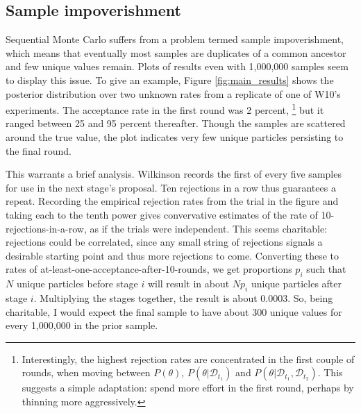 \documentclass{article}
\begin{document}
\subsection{Sample impoverishment}
\label{sec:samp_impov}
Sequential Monte Carlo suffers from a problem termed sample impoverishment, which means that eventually most samples are duplicates of a common ancestor and few unique values remain. Plots of results even with 1,000,000 samples seem to display this issue. To give an example, Figure \ref{fig:main_results} shows the posterior distribution over two unknown rates from a replicate of one of W10's experiments. %
The acceptance rate in the first round was 2 percent,
\footnote{
Interestingly, the highest rejection rates are concentrated in the first couple of rounds, when moving between $P(\theta)$, $P(\theta|\mathcal{D}_{t_1})$ and $P(\theta|\mathcal{D}_{t_1}, \mathcal{D}_{t_2})$. This suggests a simple adaptation: spend more effort in the first round, perhaps by thinning more aggressively. 
}
 but it ranged between 25 and 95 percent thereafter. Though the samples are scattered around the true value, the plot indicates very few unique particles persisting to the final round. 


This warrants a brief analysis. Wilkinson records the first of every five samples for use in the next stage's proposal. Ten rejections in a row thus guarantees a repeat. Recording the empirical rejection rates from the trial in the figure and taking each to the tenth power gives convervative estimates of the rate of 10-rejections-in-a-row, as if the trials were independent. This seems charitable: rejections could be correlated, since any small string of rejections signals a desirable starting point and thus more rejections to come. Converting these to rates of at-least-one-acceptance-after-10-rounds, we get proportions $p_i$ such that $N$ unique particles before stage $i$ will result in about $Np_i$ unique particles after stage $i$. Multiplying the stages together, the result is about 0.0003. So, being charitable, I would expect the final sample to have about 300 unique values for every 1,000,000 in the prior sample.
\end{document}
